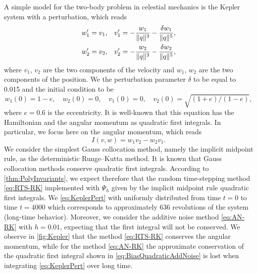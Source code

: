 \documentclass[10pt]{article}
\begin{document}
A simple model for the two-body problem in celestial mechanics is the Kepler system with a perturbation, which reads
\begin{equation}\label{eq:KeplerPert}
\begin{aligned}
	w_1' &= v_1, && v_1' = -\frac{w_1}{\lVert q\rVert^3} - \frac{\delta w_1}{\lVert q\rVert^5}, \\
	w_2' &= v_2, && v_2' = -\frac{w_2}{\lVert q\rVert^3} - \frac{\delta w_2}{\lVert q\rVert^5},
\end{aligned}
\end{equation}
where $v_1$, $v_2$ are the two components of the velocity and $w_1$, $w_2$ are the two components of the position. We  the perturbation parameter $\delta$ to be equal to 0.015 and the initial condition to be
\begin{equation}
	w_1(0) = 1 - e,\quad w_2(0) = 0, \quad v_1(0) = 0, \quad v_2(0) = \sqrt{(1 + e)/(1 − e)},
\end{equation}
where $e = 0.6$ is the eccentricity. It is well-known that this equation has the Hamiltonian and the angular momentum as quadratic first integrals. In particular, we focus here on the angular momentum, which reads
\begin{equation}\label{eq:AngularMomentum}
	I(v, w) = w_1v_2 - w_2v_1.
\end{equation}
We consider the simplest Gauss collocation method, namely the implicit midpoint rule, as the deterministic Runge--Kutta method. It is known that Gauss collocation methods conserve quadratic first integrals. According to \cref{thm:PolyInvariants}, we expect therefore that the random time-stepping method \eqref{eq:RTS-RK} implemented with $\Psi_h$ given by the implicit midpoint rule  quadratic first integrals. We  \eqref{eq:KeplerPert} with uniformly distributed  from time $t = 0$ to time $t = 4000$ which corresponds to approximately $636$ revolutions of the system (long-time behavior).  Moreover, we consider the additive noise method \eqref{eq:AN-RK} with $h = 0.01$, expecting that the first integral will not be conserved. We observe in \cref{fig:Kepler} that the method \eqref{eq:RTS-RK} conserves the angular momentum, while for the method \eqref{eq:AN-RK} the approximate conservation of the quadratic first integral shown in \eqref{eq:BiasQuadraticAddNoise} is lost when integrating \eqref{eq:KeplerPert} over long time.
\end{document}
